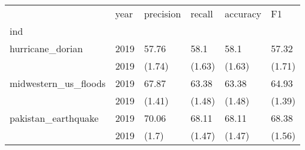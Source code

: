 \begin{tabular}{llllll}
\toprule
{} &  year & precision &  recall & accuracy &      F1 \\
ind                  &       &           &         &          &         \\
\midrule
hurricane\_dorian     &  2019 &     57.76 &    58.1 &     58.1 &   57.32 \\
                     &  2019 &    (1.74) &  (1.63) &   (1.63) &  (1.71) \\
midwestern\_us\_floods &  2019 &     67.87 &   63.38 &    63.38 &   64.93 \\
                     &  2019 &    (1.41) &  (1.48) &   (1.48) &  (1.39) \\
pakistan\_earthquake  &  2019 &     70.06 &   68.11 &    68.11 &   68.38 \\
                     &  2019 &     (1.7) &  (1.47) &   (1.47) &  (1.56) \\
\bottomrule
\end{tabular}
